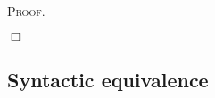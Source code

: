 \documentclass{article}
\newenvironment{proof}{\smallskip\textsc{Proof.}}{\hspace*{\fill}$\Box$}
\newcommand{\ifthelse}[3]{\ensuremath{\mathsf{if}\ {#1}\ \mathsf{then}\ {#2}\ \mathsf{else}\ {#3}}}
\newcommand{\starfun}[1]{\ensuremath{{#1}^\ast}}
\newcommand{\modelfunm}[1]{\ensuremath{\mathfrak{#1}_\ast}}
\newcommand{\wf}{\ \mbox{\em wf}}
\newcommand{\intm}[3]{\ensuremath{[\![{#3}]\!]^{\mathsf{#1}}_{\mathfrak{#2}}}}
\newcommand{\ints}[4]{\ensuremath{[\![{#4}]\!]^{\mathsf{#1}}_{\mathfrak{#2},{#3}}}}
\newcommand{\mymodelss}[3]{\ensuremath{\models_{\mathfrak{#2},{#3}}^{\mathsf{#1}}}}
\def\sep{.\,}
\begin{document}
\begin{proof}

\end{proof}

\subsection{Syntactic equivalence}
\end{document}
